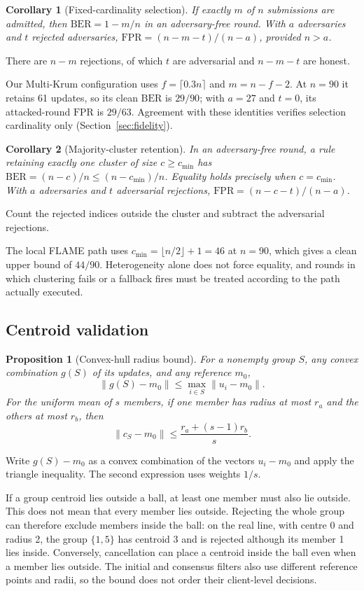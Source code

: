 \documentclass[journal]{IEEEtran}
\newtheorem{proposition}{Proposition}
\newtheorem{corollary}{Corollary}
\newcommand{\BER}{\mathrm{BER}}
\begin{document}
\begin{corollary}[Fixed-cardinality selection]\label{cor:cardinality}
If exactly $m$ of $n$ submissions are admitted, then $\BER=1-m/n$ in an adversary-free round. With $a$ adversaries and $t$ rejected adversaries, $\mathrm{FPR}=(n-m-t)/(n-a)$, provided $n>a$.
\end{corollary}
\begin{IEEEproof}
There are $n-m$ rejections, of which $t$ are adversarial and $n-m-t$ are honest.
\end{IEEEproof}
Our Multi-Krum configuration uses $f=\lceil0.3n\rceil$ and $m=n-f-2$. At $n=90$ it retains 61 updates, so its clean $\BER$ is $29/90$; with $a=27$ and $t=0$, its attacked-round $\mathrm{FPR}$ is $29/63$. Agreement with these identities verifies selection cardinality only (Section~\ref{sec:fidelity}).

\begin{corollary}[Majority-cluster retention]\label{cor:majority}
In an adversary-free round, a rule retaining exactly one cluster of size $c\geq c_{\min}$ has $\BER=(n-c)/n\leq(n-c_{\min})/n$. Equality holds precisely when $c=c_{\min}$. With $a$ adversaries and $t$ adversarial rejections, $\mathrm{FPR}=(n-c-t)/(n-a)$.
\end{corollary}
\begin{IEEEproof}
Count the rejected indices outside the cluster and subtract the adversarial rejections.
\end{IEEEproof}
The local FLAME path uses $c_{\min}=\lfloor n/2\rfloor+1=46$ at $n=90$, which gives a clean upper bound of $44/90$. Heterogeneity alone does not force equality, and rounds in which clustering fails or a fallback fires must be treated according to the path actually executed.

\subsection{Centroid validation}
\begin{proposition}[Convex-hull radius bound]\label{prop:contraction}
For a nonempty group $S$, any convex combination $g(S)$ of its updates, and any reference $m_0$,
\[
\|g(S)-m_0\|\leq\max_{i\in S}\|u_i-m_0\|.
\]
For the uniform mean of $s$ members, if one member has radius at most $r_a$ and the others at most $r_b$, then
\[
\|c_S-m_0\|\leq\frac{r_a+(s-1)r_b}{s}.
\]
\end{proposition}
\begin{IEEEproof}
Write $g(S)-m_0$ as a convex combination of the vectors $u_i-m_0$ and apply the triangle inequality. The second expression uses weights $1/s$.
\end{IEEEproof}
If a group centroid lies outside a ball, at least one member must also lie outside. This does not mean that every member lies outside. Rejecting the whole group can therefore exclude members inside the ball: on the real line, with centre 0 and radius 2, the group $\{1,5\}$ has centroid 3 and is rejected although its member 1 lies inside. Conversely, cancellation can place a centroid inside the ball even when a member lies outside. The initial and consensus filters also use different reference points and radii, so the bound does not order their client-level decisions.
\end{document}
